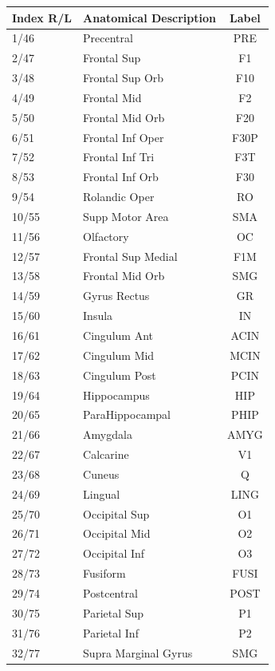 \documentclass[fleqn,10pt]{wlpeerj}
\begin{document}
\begin{table}[htbp]
\begin{tabular}{l | l | c}
Index R/L & Anatomical Description & Label \\ \hline  \hline 
  1/46 & Precentral & PRE   \\ 
  2/47 & Frontal Sup & F1 \\
3/48 & Frontal Sup Orb    &      F10 \\
4/49 & Frontal Mid        &       F2\\
5/50 & Frontal Mid Orb    &      F20\\
6/51 & Frontal Inf Oper   &    F30P\\
7/52 & Frontal Inf Tri    &     F3T\\
8/53 & Frontal Inf Orb    &      F30\\
9/54 & Rolandic Oper      &      RO\\
10/55 & Supp Motor Area  &      SMA\\
11/56 & Olfactory          &      OC\\
12/57 & Frontal Sup Medial  &   F1M\\
13/58 & Frontal Mid Orb     &   SMG\\
14/59 & Gyrus Rectus         &    GR\\
15/60 & Insula              &      IN\\
16/61 & Cingulum Ant       &   ACIN\\
17/62 & Cingulum Mid        &  MCIN\\
18/63 & Cingulum Post        & PCIN\\
19/64 & Hippocampus         &    HIP\\
20/65 & ParaHippocampal     &  PHIP\\
21/66 & Amygdala           &  AMYG\\
22/67 & Calcarine          &       V1\\
23/68 & Cuneus             &        Q\\
24/69 & Lingual            &   LING\\
25/70 & Occipital Sup      &       O1\\
26/71 & Occipital Mid      &       O2\\
27/72 & Occipital Inf      &       O3\\
28/73 & Fusiform           &    FUSI\\
29/74 & Postcentral        &   POST\\
30/75 & Parietal Sup       &       P1\\
31/76 & Parietal Inf       &       P2\\
32/77 & Supra Marginal Gyrus  &  SMG\\

\end{tabular}
\end{table}
\end{document}
